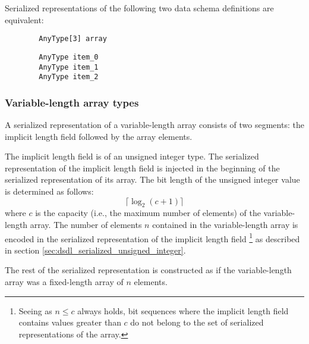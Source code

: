 \begin{remark}
    Serialized representations of the following two data schema definitions are equivalent:

    \begin{verbatim}
        AnyType[3] array
    \end{verbatim}

    \begin{verbatim}
        AnyType item_0
        AnyType item_1
        AnyType item_2
    \end{verbatim}
\end{remark}

\subsubsection{Variable-length array types}\label{sec:dsdl_serialized_variable_length_array}

A serialized representation of a variable-length array consists of two segments:
the implicit length field followed by the array elements.

The implicit length field is of an unsigned integer type.
The serialized representation of the implicit length field
is injected in the beginning of the serialized representation of its array.
The bit length of the unsigned integer value is determined as follows:
$$\lceil{}\log_2 (c + 1)\rceil{}$$
where $c$ is the capacity (i.e., the maximum number of elements) of the variable-length array.
The number of elements $n$ contained in the variable-length array is encoded
in the serialized representation of the implicit length field%
\footnote{%
    Seeing as $n \leq c$ always holds, bit sequences where the implicit length field contains values
    greater than $c$ do not belong to the set of serialized representations of the array.
}
as described in section \ref{sec:dsdl_serialized_unsigned_integer}.

The rest of the serialized representation is constructed as if the variable-length array was
a fixed-length array of $n$ elements.

